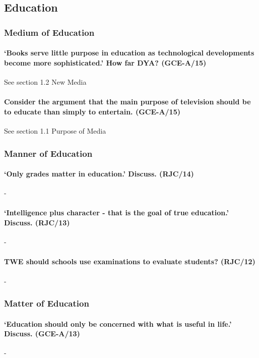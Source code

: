 \documentclass[../../main]{subfiles}
\begin{document}
\subsection{Education}

\subsubsection{Medium of Education}

\paragraph{`Books serve little purpose in education as technological developments become more sophisticated.' How far DYA? (GCE-A/15)} See section 1.2 New Media

\paragraph{Consider the argument that the main purpose of television should be to educate than simply to entertain. (GCE-A/15)} See section 1.1 Purpose of Media


\subsubsection{Manner of Education}

\paragraph{`Only grades matter in education.' Discuss. (RJC/14)}-

\paragraph{`Intelligence plus character  - that is the goal of true education.' Discuss. (RJC/13)}-

\paragraph{TWE should schools use examinations to evaluate students? (RJC/12)}-


\subsubsection{Matter of Education}

\paragraph{`Education should only be concerned with what is useful in life.' Discuss. (GCE-A/13)}-
\end{document}
